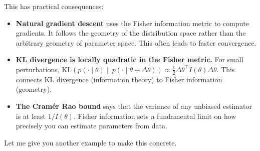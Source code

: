 \vspace{1em}

This has practical consequences:

\begin{itemize}
\item \textbf{Natural gradient descent} uses the Fisher information metric to compute gradients. It follows the geometry of the distribution space rather than the arbitrary geometry of parameter space. This often leads to faster convergence.

\item \textbf{KL divergence is locally quadratic in the Fisher metric.} For small perturbations, $\text{KL}(p(\cdot \mid \theta) \| p(\cdot \mid \theta + \Delta\theta)) \approx \frac{1}{2} \Delta\theta^\top I(\theta) \Delta\theta$. This connects KL divergence (information theory) to Fisher information (geometry).

\item \textbf{The Cramér Rao bound} says that the variance of any unbiased estimator is at least $1 / I(\theta)$. Fisher information sets a fundamental limit on how precisely you can estimate parameters from data.
\end{itemize}

\vspace{2em}

Let me give you another example to make this concrete.

\vspace{1.5em}

